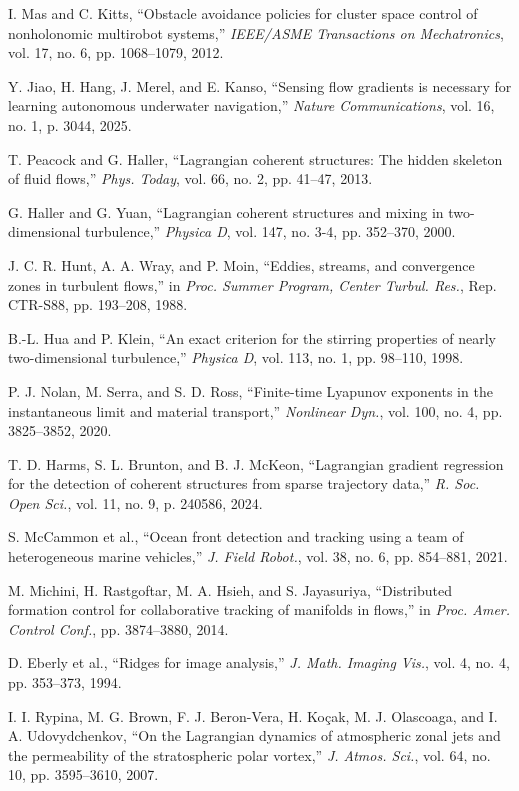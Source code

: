  I. Mas and C. Kitts, ``Obstacle avoidance policies for cluster space control of nonholonomic multirobot systems,'' \textit{IEEE/ASME Transactions on Mechatronics}, vol. 17, no. 6, pp. 1068--1079, 2012.

 Y. Jiao, H. Hang, J. Merel, and E. Kanso, ``Sensing flow gradients is necessary for learning autonomous underwater navigation,'' \textit{Nature Communications}, vol. 16, no. 1, p. 3044, 2025.

 T. Peacock and G. Haller, ``Lagrangian coherent structures: The hidden skeleton of fluid flows,'' \textit{Phys. Today}, vol. 66, no. 2, pp. 41--47, 2013.

 G. Haller and G. Yuan, ``Lagrangian coherent structures and mixing in two-dimensional turbulence,'' \textit{Physica D}, vol. 147, no. 3-4, pp. 352--370, 2000.

 J. C. R. Hunt, A. A. Wray, and P. Moin, ``Eddies, streams, and convergence zones in turbulent flows,'' in \textit{Proc. Summer Program, Center Turbul. Res.}, Rep. CTR-S88, pp. 193--208, 1988.

 B.-L. Hua and P. Klein, ``An exact criterion for the stirring properties of nearly two-dimensional turbulence,'' \textit{Physica D}, vol. 113, no. 1, pp. 98--110, 1998.

 P. J. Nolan, M. Serra, and S. D. Ross, ``Finite-time Lyapunov exponents in the instantaneous limit and material transport,'' \textit{Nonlinear Dyn.}, vol. 100, no. 4, pp. 3825--3852, 2020.

 T. D. Harms, S. L. Brunton, and B. J. McKeon, ``Lagrangian gradient regression for the detection of coherent structures from sparse trajectory data,'' \textit{R. Soc. Open Sci.}, vol. 11, no. 9, p. 240586, 2024.

 S. McCammon et al., ``Ocean front detection and tracking using a team of heterogeneous marine vehicles,'' \textit{J. Field Robot.}, vol. 38, no. 6, pp. 854--881, 2021.

 M. Michini, H. Rastgoftar, M. A. Hsieh, and S. Jayasuriya, ``Distributed formation control for collaborative tracking of manifolds in flows,'' in \textit{Proc. Amer. Control Conf.}, pp. 3874--3880, 2014.

 D. Eberly et al., ``Ridges for image analysis,'' \textit{J. Math. Imaging Vis.}, vol. 4, no. 4, pp. 353--373, 1994.

 I. I. Rypina, M. G. Brown, F. J. Beron-Vera, H. Ko\c{c}ak, M. J. Olascoaga, and I. A. Udovydchenkov, ``On the Lagrangian dynamics of atmospheric zonal jets and the permeability of the stratospheric polar vortex,'' \textit{J. Atmos. Sci.}, vol. 64, no. 10, pp. 3595--3610, 2007.

